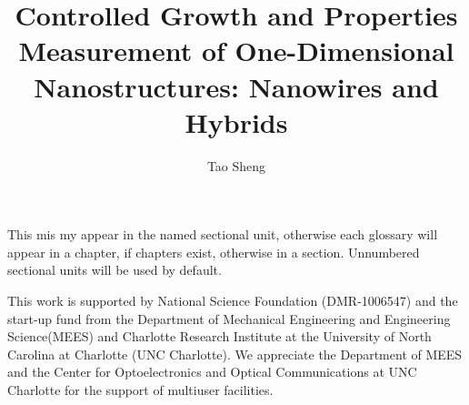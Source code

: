 
  \title{Controlled Growth and Properties Measurement of One-Dimensional Nanostructures: Nanowires and Hybrids}
  \author{Tao Sheng}
  \thesisyear{\the\year}



\maketitle




\begin{dedication}
This mis my appear in the named sectional unit, otherwise each glossary will
appear in a chapter, if chapters exist, otherwise in a section. Unnumbered
sectional units will be used by default.
\end{dedication}


\begin{ackn}
This work is supported by National Science Foundation (DMR-1006547) and the start-up fund from the Department of Mechanical Engineering and Engineering Science(MEES) and Charlotte Research Institute at the University of North Carolina at Charlotte (UNC Charlotte). We appreciate the Department of MEES and the Center for Optoelectronics and Optical Communications at UNC Charlotte for the support of multiuser facilities.
\end{ackn}
\setcounter{tocdepth}{1}

\clearpage
\tableofcontents
\clearpage
\listoftables
\clearpage
\listoffigures
\begin{singlespace}
\renewcommand{\glossarypreamble}{\thispagestyle{myheadings}}
\printglossary[type=\acronymtype]
\clearpage
\end{singlespace}


\pagebreak{} 